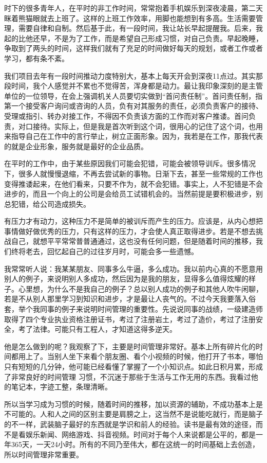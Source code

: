 \documentclass[]{book}
\begin{document}
时下的很多青年人，在平时的非工作时间，常常抱着手机娱乐到深夜凌晨，第二天眯着熊猫眼就去上班了。这样的上班工作效率，用脚也能想到有多高。生活需要管理，需要自律和自制。然后基于此，有一段时间，我让站长早起提醒我。后来，我起的比他还早，不是为了工作，而是希望自己形成习惯，对自己负责。早起晚睡，争取到了两头的时间，这样我们就有了充足的时间做好每天的规划，或者工作或者学习，都有条不紊。

我们项目去年有一段时间推动力度特别大，基本上每天开会到深夜11点过。其实那段时间，我个人感觉并不累也不觉得苦，浑身都是动力。最让我印象深刻的是主管单位的一位领导，在会上强调机关人员要切实做到``首问责任制''。首问责任制，指第一个接受客户询问或咨询的人员，负有对其服务的责任，必须负责客户的接待、受理或指引、转办对接工作，不得因不负责该方面的工作而对客户推诿。首问负责，对口接待。实际上，但是我是首次听到这个词，很用心的记住了这个词，也用来指导自己在工作中的言行举止，树立正面形象。因为，我若是在工作，那我代表的就是企业形象，服务就是最好的企业品质。

在平时的工作中，由于某些原因我们可能会犯错，可能会被领导训斥。很多情况下，很多人就慢慢退缩，不再去尝试新的事物。日渐下去，甚至一些常规的工作也变得推诿起来，在他们看来，只要不作为，就不会犯错。事实上，人不犯错是不会进步的，而且一个向上的公司是会给员工试错机会的。当然前提是要积极进步，别总犯错，给公司造成损失。

有压力才有动力，这种压力不是简单的被训斥而产生的压力。应该是，从内心想把事情做好做优秀的压力，只有这样的压力，才会使人真正取得进步。若是不想去挑战自己，就想平平常常普普通通过，这也没有任何问题，但是随着时间的推移，我们终将老去，回忆起自己的过往岁月时，可能会多一些遗憾。

我常常听人说：我某某朋友、同事多么牛逼，多么成功。我以前内心真的不愿意用别人的例子，来说明别人多成功，然后因为是我的朋友，显得多么值得炫耀的样子。心里想，为什么不是我自己的例子？总以别人成功的例子和其他人吹牛闲聊，若是不从别人那里学习到知识和进步，才是最让人丧气的。不过今天我要落入俗套，举个我同事的例子来说明时间管理的重要性。先说说同事的战绩，一级建造师取得了四个专业执业资格注册证书，考过了注册岩土，考过了造价，考过了注册安全，考了法律。可能只有工程人，才知道这得多逆天。

他是怎么做到的呢？我观察了下，主要是时间管理非常好。基本上所有碎片化的时间都用上了。当别人坐下来看个朋友圈、看个小视频的时候，他打开了书本，哪怕只有短短的几分钟，他可能已经看懂了掌握了一个小知识点。如此日积月累，形成了非常良好的时间管理 习惯，不沉迷于那些于生活与工作无用的东西。我看过他的笔记本，字迹工整，条理清晰。

所以当学习成为习惯的时候，随着时间的推移，加以资源的辅助，不成功基本上是不可能的。人和人之间的区别主要是肩膀之上，这当然不是说能吃就行，而是脑子的不一样，武装脑子最好的东西就是学识和前人的经验。读书是最有效的途径，而不是看娱乐新闻、网络游戏、抖音视频。时间对于每个人来说都是公平的，都是一年365天，一天24小时。所有的不同乃至伟大，都在这统一的时间基础上去创造，所以时间管理非常重要。
\end{document}
